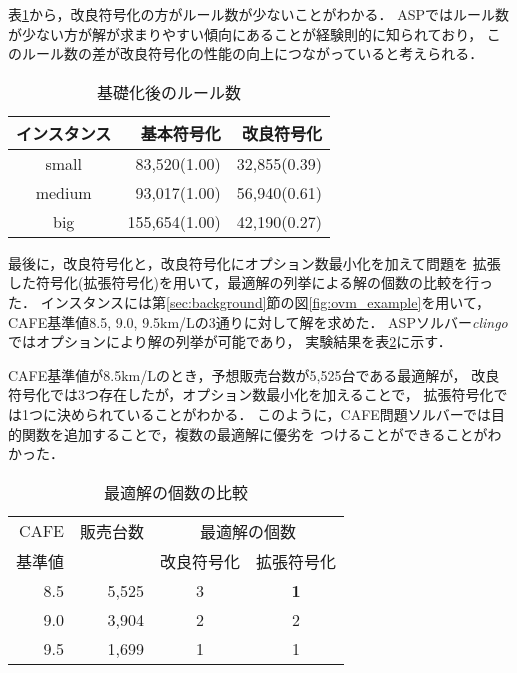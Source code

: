 表\ref{tab:rule}から，改良符号化の方がルール数が少ないことがわかる．
ASPではルール数が少ない方が解が求まりやすい傾向にあることが経験則的に知られており，
このルール数の差が改良符号化の性能の向上につながっていると考えられる．

\begin{table}[tb]
 \caption{基礎化後のルール数}
 \centering
 \begin{tabular}{crr} \bhline
  インスタンス & 基本符号化    & 改良符号化    \\ \hline
  small	    & 83,520(1.00)  & 32,855(0.39) \\ 
  medium    & 93,017(1.00)  & 56,940(0.61) \\
  big	    & 155,654(1.00) & 42,190(0.27) \\ \hline
 \end{tabular}
 \label{tab:rule}
\end{table}


最後に，改良符号化と，改良符号化にオプション数最小化を加えて問題を
拡張した符号化(拡張符号化)を用いて，最適解の列挙による解の個数の比較を行った．
インスタンスには第\ref{sec:background}節の図\ref{fig:ovm_example}を用いて，
CAFE基準値8.5, 9.0, 9.5km/Lの3通りに対して解を求めた．
ASPソルバー\textit{clingo}ではオプションにより解の列挙が可能であり，
実験結果を表\ref{tab:option}に示す．

CAFE基準値が8.5km/Lのとき，予想販売台数が5,525台である最適解が，
改良符号化では3つ存在したが，オプション数最小化を加えることで，
拡張符号化では1つに決められていることがわかる．
このように，CAFE問題ソルバーでは目的関数を追加することで，複数の最適解に優劣を
つけることができることがわかった．

\begin{table}[tb]
 \caption{最適解の個数の比較}
 \centering
  \begin{tabular}{r|r|c|c} \bhline
    \small{CAFE} & \small{販売台数} & \multicolumn{2}{c}{\small{最適解の個数}} \\ \cline{3-4}
    \small{基準値} &     & \small{改良符号化} & \small{拡張符号化}\\ \hline        
    8.5       & 5,525   & 3 & \textbf{1}\\ 
    9.0       & 3,904   & 2 & 2 \\
    9.5       & 1,699   & 1 & 1 \\ \hline
  \end{tabular}
 \label{tab:option}
\end{table}

